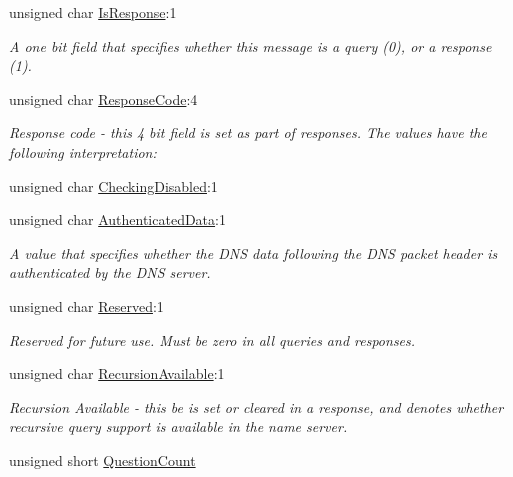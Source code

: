 \begin{DoxyCompactItemize}
unsigned char \hyperlink{struct_senergy_1_1_dns_1_1_message_header_fields_a0d0ac4fa85684c3d66a84e3392f3ef99}{Is\-Response}\-:1
\begin{DoxyCompactList}\small\item\em A one bit field that specifies whether this message is a query (0), or a response (1). \end{DoxyCompactList}\item 
unsigned char \hyperlink{struct_senergy_1_1_dns_1_1_message_header_fields_a2f42c94d4e50dd7a63b11c8b374597c4}{Response\-Code}\-:4
\begin{DoxyCompactList}\small\item\em Response code -\/ this 4 bit field is set as part of responses. The values have the following interpretation\-: \end{DoxyCompactList}\item 
unsigned char \hyperlink{struct_senergy_1_1_dns_1_1_message_header_fields_a2c846064b4582f46a94bd90b32ef1cd9}{Checking\-Disabled}\-:1
\item 
unsigned char \hyperlink{struct_senergy_1_1_dns_1_1_message_header_fields_a3788cbe9e2663b3be0cad8cbca8dc985}{Authenticated\-Data}\-:1
\begin{DoxyCompactList}\small\item\em A value that specifies whether the D\-N\-S data following the D\-N\-S packet header is authenticated by the D\-N\-S server. \end{DoxyCompactList}\item 
unsigned char \hyperlink{struct_senergy_1_1_dns_1_1_message_header_fields_afb988d15085d4f740df367d1792440c7}{Reserved}\-:1
\begin{DoxyCompactList}\small\item\em Reserved for future use. Must be zero in all queries and responses. \end{DoxyCompactList}\item 
unsigned char \hyperlink{struct_senergy_1_1_dns_1_1_message_header_fields_afbb68b60a28f855e64eb13615fc2633e}{Recursion\-Available}\-:1
\begin{DoxyCompactList}\small\item\em Recursion Available -\/ this be is set or cleared in a response, and denotes whether recursive query support is available in the name server. \end{DoxyCompactList}\item 
unsigned short \hyperlink{struct_senergy_1_1_dns_1_1_message_header_fields_a8af9bbfa134c9e0d4fc846103f7b72ad}{Question\-Count}

\end{DoxyCompactItemize}
